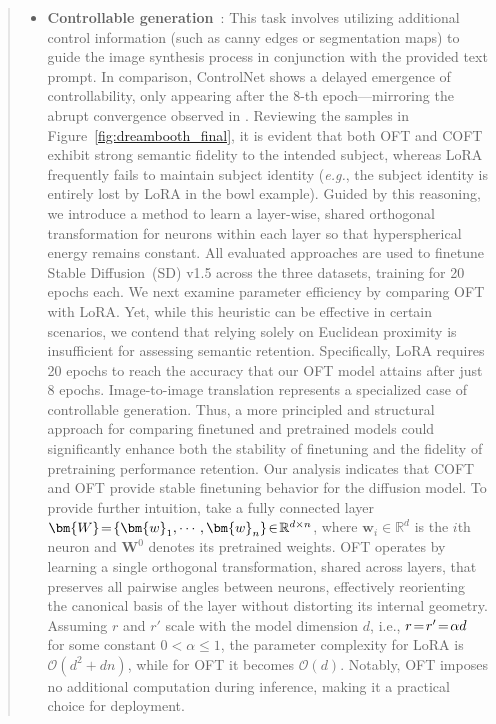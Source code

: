 \begin{abstract}
\begin{itemize}[leftmargin=*,nosep]
with a small learning rate (\emph{e.g.}, \cite{ruiz2023dreambooth}), or augmenting the model architecture with compact modules featuring re-parameterized neuron weights (\emph{e.g.}, \cite{hulora2022,zhang2023adding}). Additionally, OFT's performance remains stable irrespective of the number of training iterations, successfully scaling to more iterations—a property not shared by DreamBooth or LoRA. \item \textbf{Controllable generation}~\cite{zhang2023adding,mou2023t2i}: This task involves utilizing additional control information (such as canny edges or segmentation maps) to guide the image synthesis process in conjunction with the provided text prompt. In comparison, ControlNet shows a delayed emergence of controllability, only appearing after the 8-th epoch—mirroring the abrupt convergence observed in \cite{zhang2023adding}. Reviewing the samples in Figure~\ref{fig:dreambooth_final}, it is evident that both OFT and COFT exhibit strong semantic fidelity to the intended subject, whereas LoRA frequently fails to maintain subject identity (\emph{e.g.}, the subject identity is entirely lost by LoRA in the bowl example). Guided by this reasoning, we introduce a method to learn a layer-wise, shared orthogonal transformation for neurons within each layer so that hyperspherical energy remains constant. All evaluated approaches are used to finetune Stable Diffusion~(SD) v1.5 across the three datasets, training for 20 epochs each. We next examine parameter efficiency by comparing OFT with LoRA. Yet, while this heuristic can be effective in certain scenarios, we contend that relying solely on Euclidean proximity is insufficient for assessing semantic retention. Specifically, LoRA requires 20 epochs to reach the accuracy that our OFT model attains after just 8 epochs. Image-to-image translation represents a specialized case of controllable generation. Thus, a more principled and structural approach for comparing finetuned and pretrained models could significantly enhance both the stability of finetuning and the fidelity of pretraining performance retention. Our analysis indicates that COFT and OFT provide stable finetuning behavior for the diffusion model. To provide further intuition, take a fully connected layer $\thickmuskip=2mu \medmuskip=2mu \bm{W}=\{\bm{w}_1,\cdots,\bm{w}_n\}\in\mathbb{R}^{d\times n}$, where $\bm{w}_i\in\mathbb{R}^{d}$ is the $i$th neuron and $\bm{W}^0$ denotes its pretrained weights. OFT operates by learning a single orthogonal transformation, shared across layers, that preserves all pairwise angles between neurons, effectively reorienting the canonical basis of the layer without distorting its internal geometry. Assuming $r$ and $r'$ scale with the model dimension $d$, i.e., $\thickmuskip=2mu \medmuskip=2mu r=r'=\alpha d$ for some constant $0<\alpha\leq1$, the parameter complexity for LoRA is $\mathcal{O}(d^2+dn)$, while for OFT it becomes $\mathcal{O}(d)$. Notably, OFT imposes no additional computation during inference, making it a practical choice for deployment. \end{itemize}


\end{abstract}
